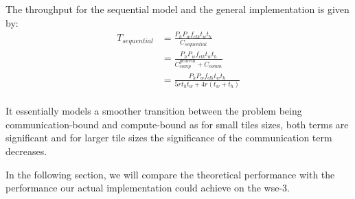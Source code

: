 The throughput for the sequential model and the general implementation is given by:
\begin{equation}
    \label{eq:throughput_sequential}
    \begin{aligned}
        T_{sequential} &= \frac{P_h P_w f_{clk} t_w t_h}{C_{sequential}} \\
        &= \frac{P_h P_w f_{clk} t_w t_h}{C_{comp}^{general} + C_{comm}} \\
        &= \frac{P_h P_w f_{clk} t_w t_h}{5r t_h t_w + 4r\left(t_w+t_h\right)} \\
    \end{aligned}
\end{equation}

It essentially models a smoother transition between the problem being communication-bound and compute-bound as for small tiles sizes, both terms are significant and for larger tile sizes the significance of the communication term decreases.

In the following section, we will compare the theoretical performance with the performance our actual implementation could achieve on the \ac{wse}-3.